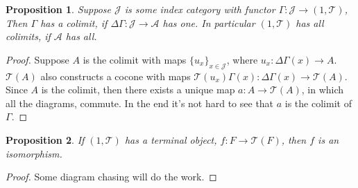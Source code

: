\documentclass[12pt]{article}
\newtheorem{proposition}{Proposition}
\begin{document}
\begin{proposition}
    Suppose $\mathcal J$ is some index category with functor $\Gamma: \mathcal J \to (1, \mathcal T)$, Then $\Gamma$ has a colimit, if $\Delta \Gamma: \mathcal J \to \mathcal A$ has one. In particular $(1, \mathcal T)$ has all colimits, if $\mathcal A$ has all. 
\end{proposition}
\begin{proof}
    Suppose $A$ is the colimit with maps $\{u_x\}_{x \in \mathcal J}$, where $u_x: \Delta \Gamma (x) \to A$. $\mathcal T(A)$ also constructs a cocone with maps $\mathcal T(u_x) \Gamma (x): \Delta \Gamma (x) \to \mathcal T(A)$. Since $A$ is the colimit, then there exists a unique map $a: A \to \mathcal T(A)$, in which all the diagrams, commute. In the end it's not hard to see that $a$ is the colimit of $\Gamma$.
\end{proof}

\begin{proposition}
    If $(1, \mathcal T)$ has a terminal object, $f: F \to \mathcal T(F)$, then $f$ is an isomorphism.
\end{proposition}
\begin{proof}
    Some diagram chasing will do the work. 
\end{proof}
\end{document}
